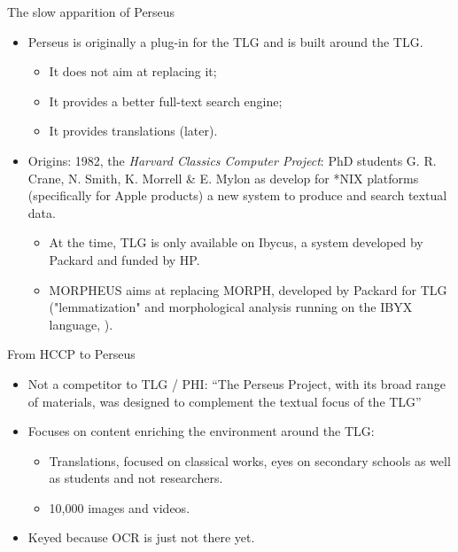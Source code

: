 \documentclass[aspectratio=169]{beamer}
\begin{document}
\begin{frame}{The slow apparition of Perseus}
    \begin{itemize}
        \item Perseus is originally a plug-in for the TLG and is built around the TLG.
            \begin{itemize}
                \item It does not aim at replacing it;
                \item It provides a better full-text search engine;
                \item It provides translations (later).
            \end{itemize}
        \item Origins: 1982, the \textit{Harvard Classics Computer Project}: PhD students G. R. Crane, N. Smith, K. Morrell \& E. Mylon as develop for *NIX platforms (specifically for Apple products) a new system to produce and search textual data. 
        \begin{itemize}
            \item At the time, TLG is only available on Ibycus, a system developed by Packard and funded by HP.
            \item MORPHEUS aims at replacing MORPH, developed by Packard for TLG ("lemmatization" and morphological analysis running on the IBYX language, \parencite{hughes_bits_1987}).
        \end{itemize}
    \end{itemize}
\end{frame}

\begin{frame}{From HCCP to Perseus}
    \begin{itemize}
        \item Not a competitor to TLG / PHI: ``The Perseus Project, with its broad range of materials, was designed to complement the textual focus of the TLG''
        \item Focuses on content enriching the environment around the TLG:
        \begin{itemize}
            \item Translations, focused on classical works, eyes on secondary schools as well as students and not researchers.
            \item 10,000 images and videos.
        \end{itemize}
        \item Keyed because OCR is just not there yet.
    \end{itemize}
\end{frame}
\end{document}

